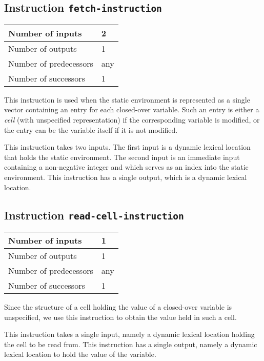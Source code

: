 \subsection{Instruction \texttt{fetch-instruction}}
\label{mir-instruction-fetch}

\begin{tabular}{|l|l|}
\hline
Number of inputs & 2\\
\hline
Number of outputs & 1\\
\hline
Number of predecessors & any\\
\hline
Number of successors & 1\\
\hline
\end{tabular}

This instruction is used when the static environment is represented as
a single vector containing an entry for each closed-over variable.
Such an entry is either a \emph{cell} (with unspecified
representation) if the corresponding variable is modified, or the
entry can be the variable itself if it is not modified.

This instruction takes two inputs.  The first input is a dynamic
lexical location that holds the static environment.  The second input
is an immediate input containing a non-negative integer and which
serves as an index into the static environment.  This instruction has
a single output, which is a dynamic lexical location.

\subsection{Instruction \texttt{read-cell-instruction}}
\label{mir-instruction-read-cell}

\begin{tabular}{|l|l|}
\hline
Number of inputs & 1\\
\hline
Number of outputs & 1\\
\hline
Number of predecessors & any\\
\hline
Number of successors & 1\\
\hline
\end{tabular}

Since the structure of a cell holding the value of a closed-over
variable is unspecified, we use this instruction to obtain the value
held in such a cell.

This instruction takes a single input, namely a dynamic lexical
location holding the cell to be read from.  This instruction has a
single output, namely a dynamic lexical location to hold the value of
the variable.

